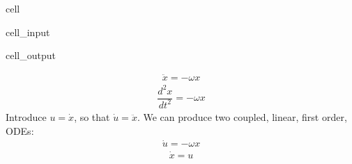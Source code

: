 \documentclass[letterpaper,10pt,english]{jupyterBook}
\begin{document}
\begin{sphinxuseclass}{cell}\begin{sphinxVerbatimInput}

\begin{sphinxuseclass}{cell_input}
\begin{sphinxVerbatim}[commandchars=\\\{\}]
     
\end{sphinxVerbatim}

\end{sphinxuseclass}\end{sphinxVerbatimInput}
\begin{sphinxVerbatimOutput}

\begin{sphinxuseclass}{cell_output}
\begin{sphinxVerbatim}
\end{sphinxVerbatim}

\noindent{}

\end{sphinxuseclass}\end{sphinxVerbatimOutput}

\end{sphinxuseclass}\begin{equation*}
\begin{split}\ddot{x} = -\omega x\end{split}
\end{equation*}\begin{equation*}
\begin{split}\dfrac{d^2x}{dt^2} = -\omega x\end{split}
\end{equation*}
\sphinxAtStartPar
Introduce \(u=\dot{x}\), so that \(\dot{u}=\ddot{x}\). We can produce two coupled, linear, first order, ODEs:
\begin{equation*}
\begin{split}\dot{u} = -\omega x\end{split}
\end{equation*}\begin{equation*}
\begin{split}\dot{x} = u\end{split}
\end{equation*}
\end{document}

